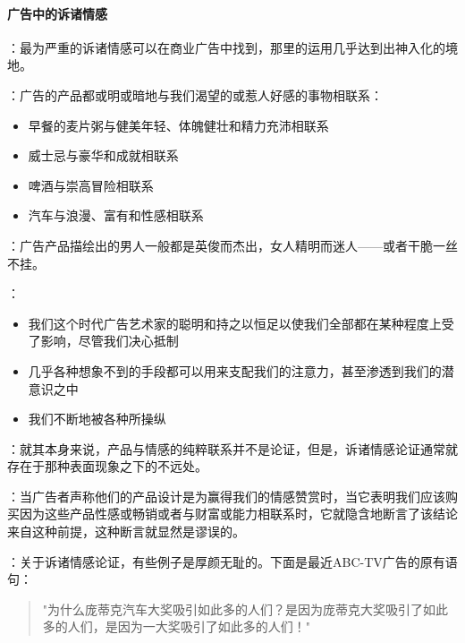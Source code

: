 \paragraph{广告中的诉诸情感}
\begin{examplebox}[title=商业广告中的诉诸情感]
：最为严重的诉诸情感可以在商业广告中找到，那里的运用几乎达到出神入化的境地。

：广告的产品都或明或暗地与我们渴望的或惹人好感的事物相联系：
\begin{itemize}
  \item 早餐的麦片粥与健美年轻、体魄健壮和精力充沛相联系
  \item 威士忌与豪华和成就相联系
  \item 啤酒与崇高冒险相联系
  \item 汽车与浪漫、富有和性感相联系
\end{itemize}

：广告产品描绘出的男人一般都是英俊而杰出，女人精明而迷人——或者干脆一丝不挂。

：
\begin{itemize}
  \item 我们这个时代广告艺术家的聪明和持之以恒足以使我们全部都在某种程度上受了影响，尽管我们决心抵制
  \item 几乎各种想象不到的手段都可以用来支配我们的注意力，甚至渗透到我们的潜意识之中
  \item 我们不断地被各种所操纵
\end{itemize}
\end{examplebox}

\begin{theorembox}[title=产品与情感的隐性联系]
：就其本身来说，产品与情感的纯粹联系并不是论证，但是，诉诸情感论证通常就存在于那种表面现象之下的不远处。

：当广告者声称他们的产品设计是为赢得我们的情感赞赏时，当它表明我们应该购买因为这些产品性感或畅销或者与财富或能力相联系时，它就隐含地断言了该结论来自这种前提，这种断言就显然是谬误的。

：关于诉诸情感论证，有些例子是厚颜无耻的。下面是最近ABC-TV广告的原有语句：

\begin{quote}
"为什么庞蒂克汽车大奖吸引如此多的人们？是因为庞蒂克大奖吸引了如此多的人们，是因为一大奖吸引了如此多的人们！"
\end{quote}
\end{theorembox}

